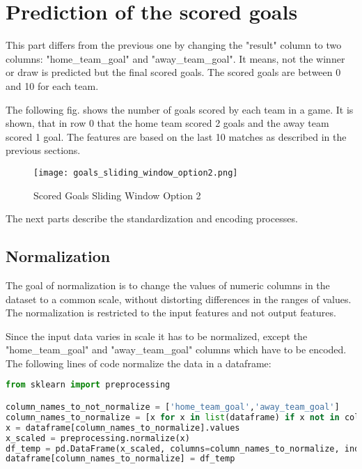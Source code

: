 \section {Prediction of the scored goals}

This part differs from the previous one by changing the "result" column to two columns: "home\_team\_goal" and "away\_team\_goal". It means, not the winner or draw is predicted but the final scored goals. The scored goals are between 0 and 10 for each team.


The following fig. shows the number of goals scored by each team in a game. It is shown, that in row 0 that the home team scored 2 goals and the away team scored 1 goal. The features are based on the last 10 matches as described in the previous sections.


\begin{figure}[H]
\begin{center}
\texttt{[image: goals\_sliding\_window\_option2.png]}
\end{center}
\caption{Scored Goals Sliding Window Option 2}
\label{fig:scored_sliding_window_option2}
\end{figure}

The next parts describe the standardization and encoding processes.


\subsection {Normalization}
The goal of normalization is to change the values of numeric columns in the dataset to a common scale, without distorting differences in the ranges of values. The normalization is restricted to the input features and not output features.

Since the input data varies in scale it has to be normalized, except the "home\_team\_goal" and "away\_team\_goal" columns which have to be encoded.
The following lines of code normalize the data in a dataframe:

\begin{lstlisting}[language=Python, caption=Scored goals Python code for normalization]
from sklearn import preprocessing

column_names_to_not_normalize = ['home_team_goal','away_team_goal']
column_names_to_normalize = [x for x in list(dataframe) if x not in column_names_to_not_normalize ]
x = dataframe[column_names_to_normalize].values
x_scaled = preprocessing.normalize(x)
df_temp = pd.DataFrame(x_scaled, columns=column_names_to_normalize, index = dataframe.index)
dataframe[column_names_to_normalize] = df_temp
\end{lstlisting}


